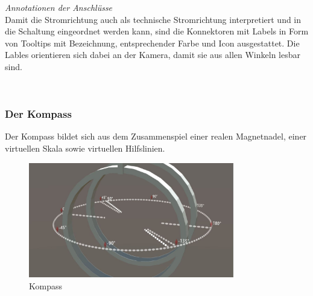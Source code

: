 \textit{Annotationen der Anschlüsse}\\
Damit die Stromrichtung auch als technische Stromrichtung interpretiert und in die Schaltung eingeordnet werden kann, sind die Konnektoren mit Labels in Form von Tooltips mit Bezeichnung, entsprechender Farbe und Icon ausgestattet. Die Lables orientieren sich dabei an der Kamera, damit sie aus allen Winkeln lesbar sind.\\

\vspace{8px}
\begin{center}
	\\
\end{center}
\vspace{6px}

\subsubsection{Der Kompass} 
\label{sec-4-2-4}
Der Kompass bildet sich aus dem Zusammenspiel einer realen Magnetnadel, einer virtuellen Skala sowie virtuellen Hilfslinien. 

\begin{figure}[H]
	\centering
	\includegraphics[width=0.8\textwidth]{images/compass.jpg}
	\caption{Kompass}
	\label{img:compass}
\end{figure}


